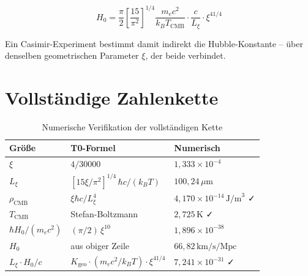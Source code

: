 \begin{equation}
    H_0 = \frac{\pi}{2}\left[\frac{15}{\pi^2}\right]^{1/4}
          \frac{m_e c^2}{k_B T_\text{CMB}}
          \cdot \frac{c}{L_\xi} \cdot \xi^{41/4}
    \label{eq:H0_from_Casimir}
\end{equation}

Ein Casimir-Experiment bestimmt damit indirekt die Hubble-Konstante --
über denselben geometrischen Parameter $\xi$, der beide verbindet.

\section{Vollständige Zahlenkette}
\label{sec:zahlen}

\begin{table}[H]
    \centering
    \caption{Numerische Verifikation der vollständigen Kette}
    \label{tab:numerical}
    \begin{tabular}{lll}
        \toprule
        \textbf{Größe} & \textbf{T0-Formel} & \textbf{Numerisch} \\
        \midrule
        $\xi$                      & $4/30000$                       & $1{,}333 \times 10^{-4}$ \\
        $L_\xi$                    & $[15\xi/\pi^2]^{1/4}\,\hbar c/(k_B T)$
                                                                      & $100{,}24\,\mu\text{m}$ \\
        $\rho_\text{CMB}$          & $\xi\hbar c/L_\xi^4$            & $4{,}170 \times 10^{-14}\,\text{J/m}^3$ ✓ \\
        $T_\text{CMB}$             & Stefan-Boltzmann                & $2{,}725\,\text{K}$ ✓ \\
        $\hbar H_0/(m_e c^2)$      & $(\pi/2)\,\xi^{10}$             & $1{,}896 \times 10^{-38}$ \\
        $H_0$                      & aus obiger Zeile                & $66{,}82\,\text{km/s/Mpc}$ \\
        $L_\xi \cdot H_0/c$        & $K_\text{geo} \cdot (m_e c^2/k_BT) \cdot \xi^{41/4}$
                                                                      & $7{,}241 \times 10^{-31}$ ✓ \\
        \bottomrule
    \end{tabular}
\end{table}

